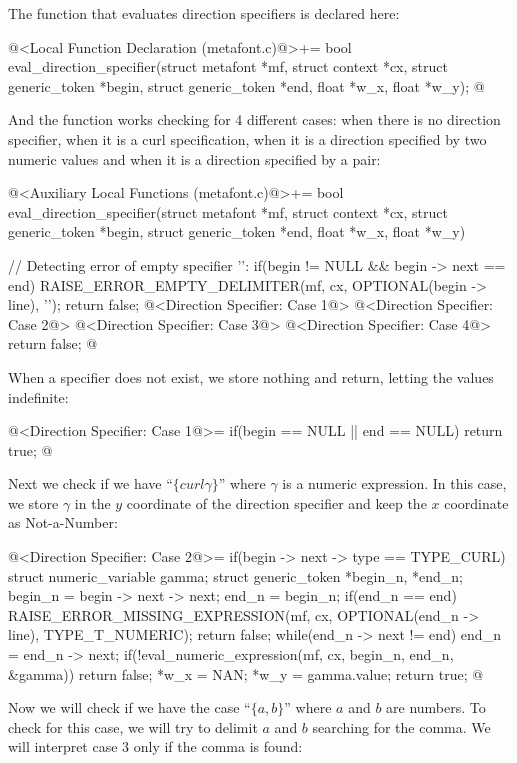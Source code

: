 {{{{The function that evaluates direction specifiers is declared here:

\iniciocodigo
@<Local Function Declaration (metafont.c)@>+=
bool eval_direction_specifier(struct metafont *mf, struct context *cx,
                              struct generic_token *begin,
                              struct generic_token *end, float *w_x,
                              float *w_y);
@
\fimcodigo

And the function works checking for 4 different cases: when there is
no direction specifier, when it is a curl specification, when it is a
direction specified by two numeric values and when it is a direction
specified by a pair:

\iniciocodigo
@<Auxiliary Local Functions (metafont.c)@>+=
bool eval_direction_specifier(struct metafont *mf, struct context *cx,
                              struct generic_token *begin,
                              struct generic_token *end, float *w_x,
                              float *w_y){
  // Detecting error of empty specifier '{}':
  if(begin != NULL && begin -> next == end){
    RAISE_ERROR_EMPTY_DELIMITER(mf, cx, OPTIONAL(begin -> line), '{');
    return false;
  }
  @<Direction Specifier: Case 1@>
  @<Direction Specifier: Case 2@>
  @<Direction Specifier: Case 3@>
  @<Direction Specifier: Case 4@>
  return false;
}
@
\fimcodigo

When a specifier does not exist, we store nothing and return, letting
the values indefinite:

\iniciocodigo
@<Direction Specifier: Case 1@>=
if(begin == NULL || end == NULL){
  return true;
}
@
\fimcodigo

Next we check if we have ``$\{ curl \gamma\}$'' where $\gamma$ is a
numeric expression. In this case, we store $\gamma$ in the $y$
coordinate of the direction specifier and keep the $x$ coordinate as
Not-a-Number:

\iniciocodigo
@<Direction Specifier: Case 2@>=
if(begin -> next -> type == TYPE_CURL){
  struct numeric_variable gamma;
  struct generic_token *begin_n, *end_n;
  begin_n = begin -> next -> next;
  end_n = begin_n;
  if(end_n == end){
    RAISE_ERROR_MISSING_EXPRESSION(mf, cx, OPTIONAL(end_n -> line),
                                   TYPE_T_NUMERIC);
    return false;
  }
  while(end_n -> next != end)
    end_n = end_n -> next;
  if(!eval_numeric_expression(mf, cx, begin_n, end_n, &gamma))
    return false;
  *w_x = NAN;
  *w_y = gamma.value;
  return true;
}
@
\fimcodigo

Now we will check if we have the case ``$\{ a , b\}$'' where $a$ and
$b$ are numbers. To check for this case, we will try to delimit $a$
and $b$ searching for the comma. We will interpret case 3 only if
the comma is found:

}}}}}
